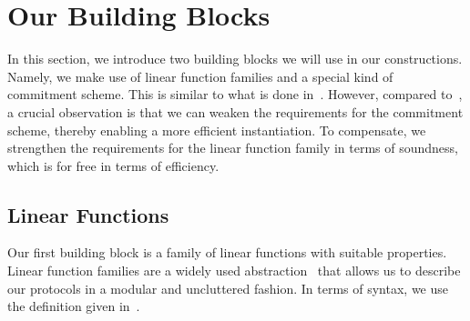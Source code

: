 \documentclass[version=final]{iacrcc}
\theoremstyle{mytheorem}				\newtheorem{theorem}{Theorem}
\theoremstyle{myplain}
\theoremstyle{mydefinition}
\theoremstyle{myremark}
\begin{document}
 \section{Our Building Blocks}
\label{sec:toothpicks:buildingblocks}
In this section, we introduce two building blocks we will use in our constructions.
Namely, we make use of linear function families and a special kind of commitment scheme.
This is similar to what is done in~\cite{EC:PanWag23}.
However, compared to~\cite{EC:PanWag23}, a crucial observation is that we can weaken the requirements for the commitment scheme, thereby enabling a more efficient instantiation.
To compensate, we strengthen the requirements for the linear function family in terms of soundness, which is for free in terms of efficiency.

 \subsection{Linear Functions}
\label{sec:toothpicks:buildingblocks:linearfunctions}
Our first building block is a family of linear functions with suitable properties.
Linear function families are a widely used abstraction~\cite{EC:HauKilLos19,AC:KatLosRos21,C:CHLLW22,EC:PanWag23,EC:TesZhu23a} that allows us to describe our protocols in a modular and uncluttered fashion.
In terms of syntax, we use the definition given in~\cite{EC:PanWag23}.
\end{document}
